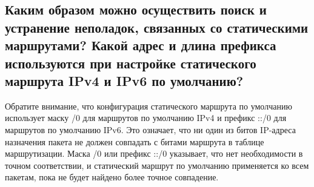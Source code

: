 \subsection{Каким образом можно осуществить поиск и устранение неполадок,
    связанных со статическими маршрутами?
    Какой адрес и длина префикса используются при настройке
    статического маршрута IPv4 и IPv6 по умолчанию?}

Обратите внимание, что конфигурация статического маршрута
по умолчанию использует маску /0 для маршрутов по умолчанию IPv4
и префикс ::/0 для маршрутов по умолчанию IPv6.
Это означает, что ни один из битов IP-адреса назначения пакета
не должен совпадать с битами маршрута в таблице маршрутизации.
Маска /0 или префикс ::/0 указывает, что нет необходимости
в точном соответствии, и статический маршрут по умолчанию применяется
ко всем пакетам, пока не будет найдено более точное совпадение.